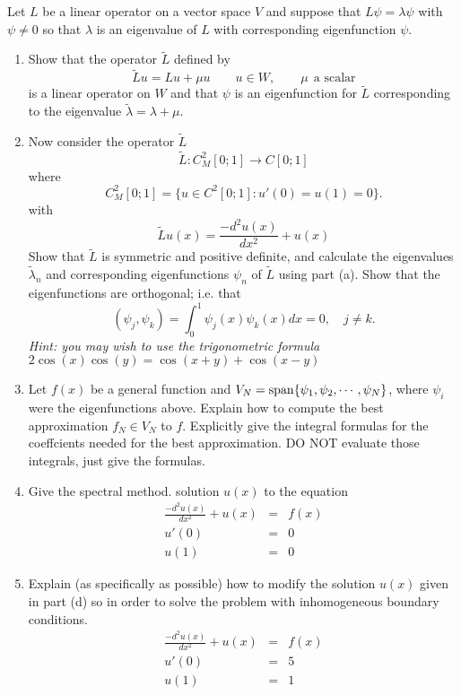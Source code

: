 
Let $L$ be a linear operator on a vector space $V$ and suppose that $L\psi=\lambda \psi$ with $\psi \neq 0$ so that $\lambda$ is an eigenvalue of $L$ with corresponding eigenfunction $\psi$.
\begin{enumerate}
\item Show that the operator $\tilde{L}$ defined by
\[
\tilde{L}u = Lu + \mu u \qquad u \in W, \qquad \mu \:\: \mbox{a scalar}
\]
is a linear operator on $W$ and that $\psi$ is an eigenfunction for $\tilde{L}$ corresponding to the eigenvalue $\tilde{\lambda}= \lambda + \mu$. 
\item Now consider the operator $\tilde{L}$
\[
\tilde{L} : C^2_M [0; 1] \rightarrow C[0; 1]\]
where
\[
 C^2_M [0; 1] = \{u \in C^2[0; 1] : u'(0) = u(1) = 0\}.
 \]
 with
\[
\tilde{L}u(x) = \frac{-d^2u(x)}{dx^2}+ u(x)
\]
Show that $\tilde{L}$ is symmetric and positive definite, and calculate the eigenvalues $\tilde{\lambda}_n$ and corresponding eigenfunctions $\psi_n$ of $\tilde{L}$ using part (a).  Show that the eigenfunctions are orthogonal; i.e. that 
\[
(\psi_j,\psi_k) = \int_0^1 \psi_j(x) \psi_k(x) dx = 0, \quad j \neq k.
\]
\emph{Hint: you may wish to use the trigonometric formula $2\cos(x)\cos(y) = \cos(x+ y) + \cos(x-y)$ }

\item  Let $f(x)$ be a general function and $V_N= {\rm span}\{\psi_1, \psi_2, \cdots, \psi_N\}$, where $\psi_i$ were the eigenfunctions above.  Explain how to compute the best approximation $f_N \in V_N$ to $f$. Explicitly give the integral formulas for the coeffcients needed for the best approximation. DO NOT evaluate those integrals, just give the formulas.

\item Give the spectral method. solution $u(x)$ to the equation 
\begin{eqnarray*}
\frac{-d^2u(x)}{dx^2}+ u(x) &=& f(x) \\
                        u'(0) &=& 0\\
                        u(1) &=& 0
\end{eqnarray*}


\item Explain (as specifically as possible) how to modify the solution $u(x)$ given in part (d) so in order to solve the problem with inhomogeneous boundary conditions.  
\begin{eqnarray*}
\frac{-d^2u(x)}{dx^2}+ u(x)  &=& f(x) \\
                        u'(0) &=& 5\\
                        u(1)&=& 1
\end{eqnarray*}

\end{enumerate}


